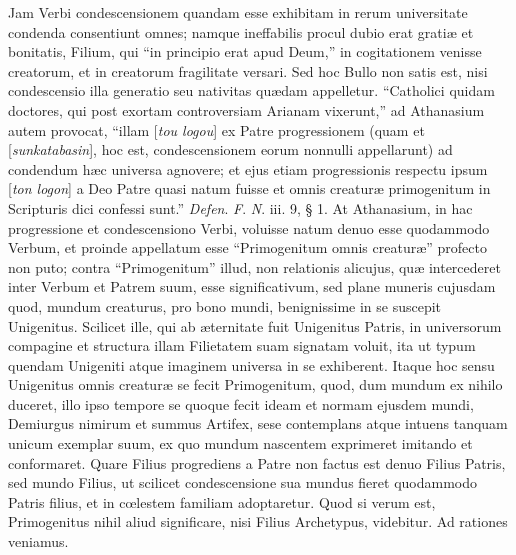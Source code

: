Jam Verbi
condescensionem quandam esse exhibitam in rerum universitate condenda
consentiunt omnes; namque ineffabilis procul dubio erat gratiæ
et bonitatis, Filium, qui ``in principio erat apud Deum,'' in
cogitationem venisse creatorum, et in creatorum fragilitate versari.
Sed hoc Bullo non satis est, nisi condescensio illa generatio seu
nativitas quædam appelletur. ``Catholici quidam doctores, qui post
exortam controversiam Arianam vixerunt,'' ad Athanasium autem provocat,
``illam [\emph{tou logou}] ex Patre progressionem (quam et
[\emph{sunkatabasin}], hoc est, condescensionem eorum nonnulli
appellarunt) ad condendum hæc universa agnovere; et ejus etiam
progressionis respectu ipsum [\emph{ton logon}] a Deo Patre quasi
natum fuisse et omnis creaturæ primogenitum in Scripturis dici
confessi sunt.'' \emph{Defen}. \emph{F}. \emph{N}. iii. 9, § 1. At
Athanasium, in hac progressione et condescensiono Verbi, voluisse
natum denuo esse quodammodo Verbum, et proinde appellatum esse ``Primogenitum omnis creaturæ'' profecto non puto; contra
``Primogenitum'' illud, non relationis alicujus, quæ intercederet
inter Verbum et Patrem suum, esse significativum, sed plane muneris
cujusdam quod, mundum creaturus, pro bono mundi, benignissime in se
suscepit Unigenitus. Scilicet ille, qui ab æternitate fuit Unigenitus
Patris, in universorum compagine et structura illam Filietatem suam
signatam voluit, ita ut typum quendam Unigeniti atque imaginem
universa in se exhiberent. Itaque hoc sensu Unigenitus omnis creaturæ
se fecit Primogenitum, quod, dum mundum ex nihilo duceret, illo ipso
tempore se quoque fecit ideam et normam ejusdem mundi, Demiurgus
nimirum et summus Artifex, sese contemplans atque intuens tanquam
unicum exemplar suum, ex quo mundum nascentem exprimeret imitando et conformaret. Quare Filius progrediens a Patre non factus est denuo
Filius Patris, sed mundo Filius, ut scilicet condescensione sua mundus
fieret quodammodo Patris filius, et in cœlestem familiam adoptaretur.
Quod si verum est, Primogenitus nihil aliud significare, nisi Filius
Archetypus, videbitur. Ad rationes veniamus.


